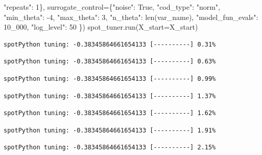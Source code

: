 \documentclass[
  letterpaper,
  DIV=11,
  numbers=noendperiod]{scrreprt}
\newenvironment{Shaded}{\begin{snugshade}}{\end{snugshade}}
\newcommand{\BuiltInTok}[1]{\textcolor[rgb]{0.00,0.23,0.31}{#1}}
\newcommand{\DecValTok}[1]{\textcolor[rgb]{0.68,0.00,0.00}{#1}}
\newcommand{\NormalTok}[1]{\textcolor[rgb]{0.00,0.23,0.31}{#1}}
\newcommand{\OperatorTok}[1]{\textcolor[rgb]{0.37,0.37,0.37}{#1}}
\newcommand{\StringTok}[1]{\textcolor[rgb]{0.13,0.47,0.30}{#1}}
\newcommand{\VariableTok}[1]{\textcolor[rgb]{0.07,0.07,0.07}{#1}}
\begin{document}
\begin{Shaded}
\begin{Highlighting}[]
                                   \StringTok{"repeats"}\NormalTok{: }\DecValTok{1}\NormalTok{\},}
\NormalTok{                   surrogate\_control}\OperatorTok{=}\NormalTok{\{}\StringTok{"noise"}\NormalTok{: }\VariableTok{True}\NormalTok{,}
                                      \StringTok{"cod\_type"}\NormalTok{: }\StringTok{"norm"}\NormalTok{,}
                                      \StringTok{"min\_theta"}\NormalTok{: }\OperatorTok{{-}}\DecValTok{4}\NormalTok{,}
                                      \StringTok{"max\_theta"}\NormalTok{: }\DecValTok{3}\NormalTok{,}
                                      \StringTok{"n\_theta"}\NormalTok{: }\BuiltInTok{len}\NormalTok{(var\_name),}
                                      \StringTok{"model\_fun\_evals"}\NormalTok{: }\DecValTok{10\_000}\NormalTok{,}
                                      \StringTok{"log\_level"}\NormalTok{: }\DecValTok{50}
\NormalTok{                                      \})}
\NormalTok{spot\_tuner.run(X\_start}\OperatorTok{=}\NormalTok{X\_start)}
\end{Highlighting}
\end{Shaded}

\begin{verbatim}
spotPython tuning: -0.38345864661654133 [----------] 0.31% 
\end{verbatim}

\begin{verbatim}
spotPython tuning: -0.38345864661654133 [----------] 0.63% 
\end{verbatim}

\begin{verbatim}
spotPython tuning: -0.38345864661654133 [----------] 0.99% 
\end{verbatim}

\begin{verbatim}
spotPython tuning: -0.38345864661654133 [----------] 1.37% 
\end{verbatim}

\begin{verbatim}
spotPython tuning: -0.38345864661654133 [----------] 1.62% 
\end{verbatim}

\begin{verbatim}
spotPython tuning: -0.38345864661654133 [----------] 1.91% 
\end{verbatim}

\begin{verbatim}
spotPython tuning: -0.38345864661654133 [----------] 2.15% 
\end{verbatim}
\end{document}
